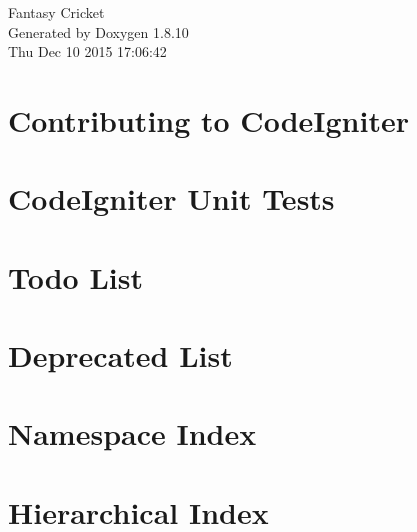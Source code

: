 \documentclass[twoside]{book}
\newcommand{\+}{\discretionary{\mbox{\scriptsize$\hookleftarrow$}}{}{}}
\newcommand{\clearemptydoublepage}{%
  \newpage{\pagestyle{empty}\cleardoublepage}%
}
\begin{document}
\hypersetup{pageanchor=false,
             bookmarks=true,
             bookmarksnumbered=true,
             pdfencoding=unicode
            }
\begin{titlepage}
\vspace*{7cm}
\begin{center}%
{\Large Fantasy Cricket }\\
\vspace*{1cm}
{\large Generated by Doxygen 1.8.10}\\
\vspace*{0.5cm}
{\small Thu Dec 10 2015 17:06:42}\\
\end{center}
\end{titlepage}
\clearemptydoublepage
\tableofcontents
\clearemptydoublepage
{}
\hypersetup{pageanchor=true}

\chapter{Contributing to Code\+Igniter}
\label{md__d_1_xampp_htdocs__s_d__git__l3_t2__f_c_contributing}
\hypertarget{md__d_1_xampp_htdocs__s_d__git__l3_t2__f_c_contributing}{}

\chapter{Code\+Igniter Unit Tests}
\label{md__d_1_xampp_htdocs__s_d__git__l3_t2__f_c_tests__r_e_a_d_m_e}
\hypertarget{md__d_1_xampp_htdocs__s_d__git__l3_t2__f_c_tests__r_e_a_d_m_e}{}

\chapter{Todo List}
\label{todo}
\hypertarget{todo}{}

\chapter{Deprecated List}
\label{deprecated}
\hypertarget{deprecated}{}

\chapter{Namespace Index}

\chapter{Hierarchical Index}

\end{document}
